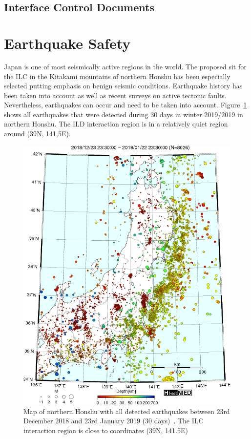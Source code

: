 \subsection{Interface Control Documents}


\section{Earthquake Safety}
Japan is one of most seismically active regions in the world. The proposed sit for the ILC in the Kitakami mountains of northern Honshu has been especially selected putting emphasis on benign seismic conditions. Earthquake history has been taken into account as well as recent surveys on active tectonic faults. Nevertheless, earthquakes can occur and need to be taken into account. Figure~\ref{ild:fig:integration:earthquake_map} shows all earthquakes that were detected during 30 days in winter 2019/2019 in northern Honshu. The ILD interaction region is in a relatively quiet region around (39N, 141,5E).

\begin{figure}[ht]
\includegraphics[width=0.8\hsize]{Integration/fig/earthquake_map.png}

\caption{\label{ild:fig:integration:earthquake_map}Map of northern Honshu with all detected earthquakes between 23rd December 2018 and 23rd January 2019 (30 days)~\cite{ild:bib:hi-net}. The ILC interaction region is close to coordinates (39N, 141.5E)}
\end{figure}

